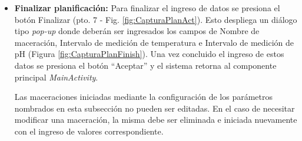 \begin{itemize}
                    \item \textbf{Finalizar planificación:} Para finalizar el ingreso de datos se presiona el botón Finalizar (pto. 7 - Fig. \ref{fig:CapturaPlanAct}). Esto despliega un diálogo tipo \textit{pop-up} donde deberán ser ingresados los campos de Nombre de maceración, Intervalo de medición de temperatura e Intervalo de medición de pH (Figura \ref{fig:CapturaPlanFinish}). Una vez concluido el ingreso de estos datos se presiona el botón ``Aceptar'' y el sistema retorna al componente principal \textit{MainActivity}. 
                    
                    \par Las maceraciones iniciadas mediante la configuración de los parámetros nombrados en esta subsección no pueden ser editadas. En el caso de necesitar modificar una maceración, la misma debe ser eliminada e iniciada nuevamente con el ingreso de valores correspondiente.
                \end{itemize}
            
